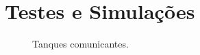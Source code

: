 \chapter{Testes e Simulações}

\begin{center}
  \begin{figure}[b]
    \centering
      
      \caption{Tanques comunicantes.}
      \label{fig:tanques_comunicantes}
  \end{figure}
\end{center}